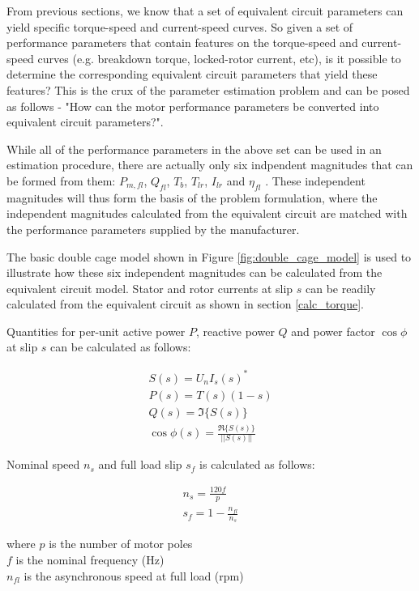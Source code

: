 \documentclass{article}
\begin{document}
From previous sections, we know that a set of equivalent circuit parameters can yield specific torque-speed and current-speed curves. So given a set of performance parameters that contain features on the torque-speed and current-speed curves (e.g. breakdown torque, locked-rotor current, etc), is it possible to determine the corresponding equivalent circuit parameters that yield these features? This is the crux of the parameter estimation problem and can be posed as follows - "How can the motor performance parameters be converted into equivalent circuit parameters?".

While all of the performance parameters in the above set can be used in an estimation procedure, there are actually only six indpendent magnitudes that can be formed from them: $P_{m,fl}$, $Q_{fl}$, $T_{b}$, $T_{lr}$, $I_{lr}$ and $\eta_{fl}$ \cite{pedra_2004}. These independent magnitudes will thus form the basis of the problem formulation, where the independent magnitudes calculated from the equivalent circuit are matched with the performance parameters supplied by the manufacturer.

The basic double cage model shown in Figure \ref{fig:double_cage_model} is used to illustrate how these six independent magnitudes can be calculated from the equivalent circuit model. Stator and rotor currents at slip $s$ can be readily calculated from the equivalent circuit as shown in section \ref{calc_torque}.

Quantities for per-unit active power $P$, reactive power $Q$ and power factor $\cos{\phi}$ at slip $s$ can be calculated as follows:

\begin{eqnarray}
S(s) = U_{n} I_{s}(s)^{*} \\
P(s) = T(s) (1 - s) \\
Q(s) = \Im \{ S(s) \} \\
\cos{\phi} (s) = \frac{\Re \{ S(s) \}}{|| S(s) ||}
\end{eqnarray}

Nominal speed $n_{s}$ and full load slip $s_{f}$ is calculated as follows:

\begin{eqnarray}
n_{s} = \frac{120f}{p} \\
s_{f} = 1 - \frac{n_{fl}}{n_s}
\end{eqnarray}

\noindent where \indent $p$ is the number of motor poles \\
\indent $f$ is the nominal frequency (Hz) \\
\indent $n_{fl}$ is the asynchronous speed at full load (rpm)
\end{document}
